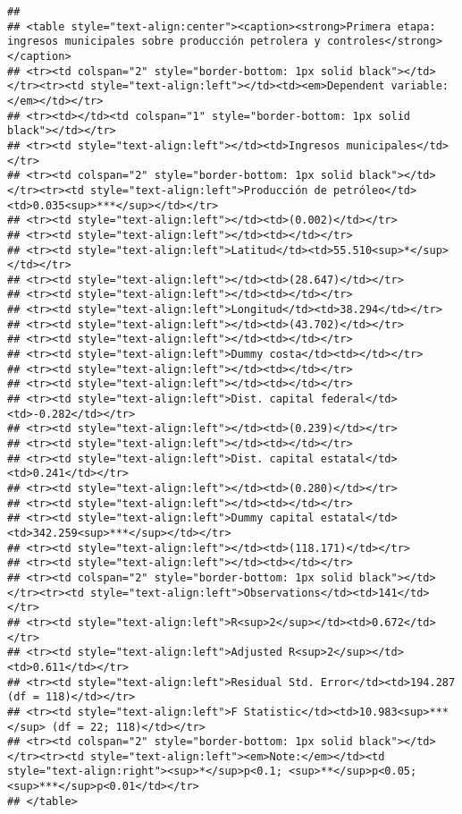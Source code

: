 \documentclass[
]{article}
\begin{document}
\begin{verbatim}
## 
## <table style="text-align:center"><caption><strong>Primera etapa: ingresos municipales sobre producción petrolera y controles</strong></caption>
## <tr><td colspan="2" style="border-bottom: 1px solid black"></td></tr><tr><td style="text-align:left"></td><td><em>Dependent variable:</em></td></tr>
## <tr><td></td><td colspan="1" style="border-bottom: 1px solid black"></td></tr>
## <tr><td style="text-align:left"></td><td>Ingresos municipales</td></tr>
## <tr><td colspan="2" style="border-bottom: 1px solid black"></td></tr><tr><td style="text-align:left">Producción de petróleo</td><td>0.035<sup>***</sup></td></tr>
## <tr><td style="text-align:left"></td><td>(0.002)</td></tr>
## <tr><td style="text-align:left"></td><td></td></tr>
## <tr><td style="text-align:left">Latitud</td><td>55.510<sup>*</sup></td></tr>
## <tr><td style="text-align:left"></td><td>(28.647)</td></tr>
## <tr><td style="text-align:left"></td><td></td></tr>
## <tr><td style="text-align:left">Longitud</td><td>38.294</td></tr>
## <tr><td style="text-align:left"></td><td>(43.702)</td></tr>
## <tr><td style="text-align:left"></td><td></td></tr>
## <tr><td style="text-align:left">Dummy costa</td><td></td></tr>
## <tr><td style="text-align:left"></td><td></td></tr>
## <tr><td style="text-align:left"></td><td></td></tr>
## <tr><td style="text-align:left">Dist. capital federal</td><td>-0.282</td></tr>
## <tr><td style="text-align:left"></td><td>(0.239)</td></tr>
## <tr><td style="text-align:left"></td><td></td></tr>
## <tr><td style="text-align:left">Dist. capital estatal</td><td>0.241</td></tr>
## <tr><td style="text-align:left"></td><td>(0.280)</td></tr>
## <tr><td style="text-align:left"></td><td></td></tr>
## <tr><td style="text-align:left">Dummy capital estatal</td><td>342.259<sup>***</sup></td></tr>
## <tr><td style="text-align:left"></td><td>(118.171)</td></tr>
## <tr><td style="text-align:left"></td><td></td></tr>
## <tr><td colspan="2" style="border-bottom: 1px solid black"></td></tr><tr><td style="text-align:left">Observations</td><td>141</td></tr>
## <tr><td style="text-align:left">R<sup>2</sup></td><td>0.672</td></tr>
## <tr><td style="text-align:left">Adjusted R<sup>2</sup></td><td>0.611</td></tr>
## <tr><td style="text-align:left">Residual Std. Error</td><td>194.287 (df = 118)</td></tr>
## <tr><td style="text-align:left">F Statistic</td><td>10.983<sup>***</sup> (df = 22; 118)</td></tr>
## <tr><td colspan="2" style="border-bottom: 1px solid black"></td></tr><tr><td style="text-align:left"><em>Note:</em></td><td style="text-align:right"><sup>*</sup>p<0.1; <sup>**</sup>p<0.05; <sup>***</sup>p<0.01</td></tr>
## </table>
\end{verbatim}
\end{document}

